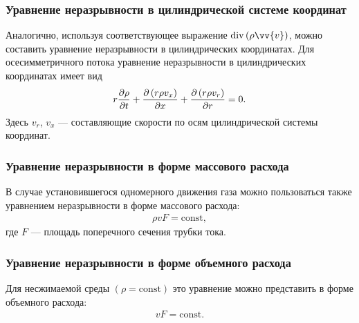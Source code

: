 	\subsubsection{Уравнение неразрывности в цилиндрической системе координат}
	Аналогично, используя соответствующее выражение $\diverg\left(\rho\vv{v}\right)$, можно составить уравнение неразрывности в цилиндрических координатах. Для осесимметричного потока уравнение неразрывности в цилиндрических координатах имеет вид
	\begin{gather*}
		r\frac{\partial\rho}{\partial t} + \frac{\partial\left(r\rho v_x\right)}{\partial x} + \frac{\partial\left(r\rho v_r\right)}{\partial r} = 0.
	\end{gather*}\n
	Здесь $v_r$, $v_x$ --- составляющие скорости по осям цилиндрической системы координат.\n
	
	\subsubsection{Уравнение неразрывности в форме массового расхода}
	В случае установившегося одномерного движения газа можно пользоваться также уравнением неразрывности в форме массового расхода:
	\begin{gather*}
		\rho v F = \mathrm{const},
	\end{gather*}
	где $F$ --- площадь поперечного сечения трубки тока.\n
	
	\subsubsection{Уравнение неразрывности в форме объемного расхода}
	Для несжимаемой среды $\left(\rho = \mathrm{const}\right)$ это уравнение можно представить в форме объемного расхода:
	\begin{gather*}
		vF = \mathrm{const}.
	\end{gather*}
	
